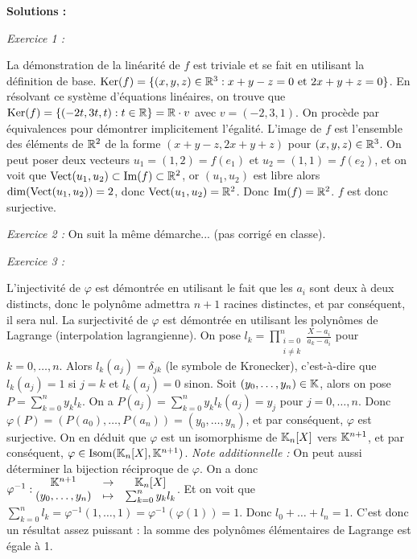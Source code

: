 \documentclass[12pt, a4paper]{report}
\begin{document}
\textbf{Solutions :}

\textit{Exercice 1 :}

\begin{outline}
    \1 La démonstration de la linéarité de $f$ est triviale et se fait en utilisant la définition de base.
    \1 $\mathrm{Ker}(f) = \{(x,y,z) \in \mathbb{R}^3 : x+y-z = 0 \text{ et } 2x+y+z = 0\}$. En résolvant ce système d'équations linéaires, on trouve que $\mathrm{Ker}(f) = \{(-2t,3t,t) : t \in \mathbb{R}\}=\mathbb{R}\cdot v$ avec $v = (-2,3,1)$. On procède par équivalences pour démontrer implicitement l'égalité.
    \1 L'image de $f$ est l'ensemble des éléments de $\mathbb{R}^2$ de la forme $(x+y-z, 2x+y+z)$ pour $(x,y,z) \in \mathbb{R}^3$. On peut poser deux vecteurs $u_1 = (1,2) = f(e_1)$ et $u_2 = (1,1) = f(e_2)$, et on voit que $\mathrm{Vect}(u_1,u_2) \subset \mathrm{Im}(f) \subset \mathbb{R}^2$, or $(u_1,u_2)$ est libre alors $\dim(\mathrm{Vect}(u_1,u_2)) = 2$, donc $\mathrm{Vect}(u_1,u_2) = \mathbb{R}^2$. Donc $\mathrm{Im}(f) = \mathbb{R}^2$. $f$ est donc surjective.
\end{outline}

\textit{Exercice 2 :} On suit la même démarche... (pas corrigé en classe).

\textit{Exercice 3 :}

\begin{outline}
    \1 L'injectivité de $\varphi$ est démontrée en utilisant le fait que les $a_i$ sont deux à deux distincts, donc le polynôme admettra $n+1$ racines distinctes, et par conséquent, il sera nul.
    \1 La surjectivité de $\varphi$ est démontrée en utilisant les polynômes de Lagrange (interpolation lagrangienne).
    \2 On pose $l_k = \prod_{\substack{i=0 \\ i \ne k}}^n \frac{X - a_i}{a_k - a_i}$ pour $k = 0,\dots,n$. Alors $l_k(a_j) = \delta_{jk}$ (le symbole de Kronecker), c'est-à-dire que $l_k(a_j) = 1$ si $j=k$ et $l_k(a_j) = 0$ sinon.
    \2 Soit $(y_0,\dots,y_n) \in \mathbb{K}$, alors on pose $P = \sum_{k=0}^n y_k l_k$. On a $P(a_j) = \sum_{k=0}^n y_k l_k(a_j) = y_j$ pour $j=0,\dots,n$. Donc $\varphi(P) = (P(a_0),\dots,P(a_n)) = (y_0,\dots,y_n)$, et par conséquent, $\varphi$ est surjective.
    \1 On en déduit que $\varphi$ est un isomorphisme de $\mathbb{K}_n[X]$ vers $\mathbb{K}^{n+1}$, et par conséquent, $\varphi \in \mathrm{Isom}(\mathbb{K}_n[X],\mathbb{K}^{n+1})$.
    \1 \textit{Note additionnelle :} On peut aussi déterminer la bijection réciproque de $\varphi$. On a donc $\varphi^{-1} : \begin{matrix}
\mathbb{K}^{n+1} &\to &\mathbb{K}_n[X]\\
(y_0,\dots,y_n) &\mapsto &\sum_{k=0}^n y_k l_k
\end{matrix}$.
    \2 Et on voit que $\sum_{k=0}^n l_k = \varphi^{-1}(1,\dots,1) = \varphi^{-1}(\varphi(1)) = 1$. Donc $l_0 + \dots + l_n = 1$.
    \2 C'est donc un résultat assez puissant : la somme des polynômes élémentaires de Lagrange est égale à 1.
\end{outline}
\end{document}
